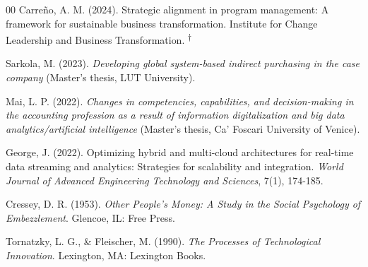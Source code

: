 \documentclass[conference]{IEEEtran}
\newcommand{\rvr}{\textsuperscript{$\dagger$}}
\begin{document}
\begin{thebibliography}{00}
 Carre\~no, A. M. (2024). Strategic alignment in program management: A framework for sustainable business transformation. Institute for Change Leadership and Business Transformation. \rvr

 Sarkola, M. (2023). \emph{Developing global system-based indirect purchasing in the case company} (Master's thesis, LUT University).

 Mai, L. P. (2022). \emph{Changes in competencies, capabilities, and decision-making in the accounting profession as a result of information digitalization and big data analytics/artificial intelligence} (Master's thesis, Ca' Foscari University of Venice).

 George, J. (2022). Optimizing hybrid and multi-cloud architectures for real-time data streaming and analytics: Strategies for scalability and integration. \emph{World Journal of Advanced Engineering Technology and Sciences}, 7(1), 174-185.

 Cressey, D. R. (1953). \emph{Other People's Money: A Study in the Social Psychology of Embezzlement}. Glencoe, IL: Free Press.

 Tornatzky, L. G., \& Fleischer, M. (1990). \emph{The Processes of Technological Innovation}. Lexington, MA: Lexington Books.

\end{thebibliography}
\end{document}
